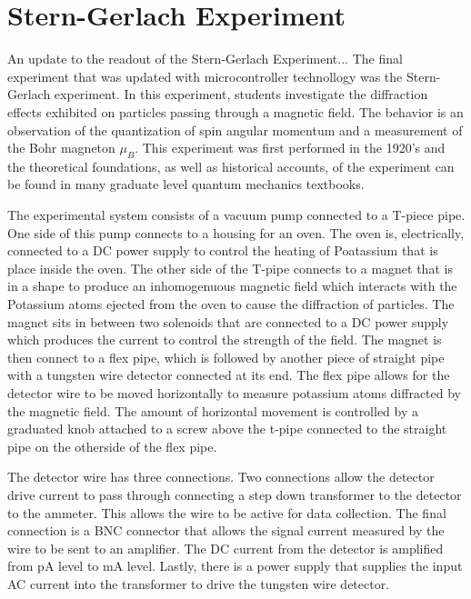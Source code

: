 \section{Stern-Gerlach Experiment}
An update to the readout of the Stern-Gerlach Experiment...
The final experiment that was updated with microcontroller technollogy was the Stern-Gerlach experiment.
In this experiment, students investigate the diffraction effects exhibited on particles passing through a magnetic field.
The behavior is an observation of the quantization of spin angular momentum and a measurement of the Bohr magneton $\mu_{B}$.
This experiment was first performed in the 1920's and the theoretical foundations, as well as historical accounts, of the experiment can be found in many graduate level quantum mechanics textbooks.

The experimental system consists of a vacuum pump connected to a T-piece pipe.
One side of this pump connects to a housing for an oven.
The oven is, electrically, connected to a DC power supply to control the heating of Poatassium that is place inside the oven.
The other side of the T-pipe connects to a magnet that is in a shape to produce an inhomogenuous magnetic field which interacts with the Potassium atoms ejected from the oven to cause the diffraction of particles.
The magnet sits in between two solenoids that are connected to a DC power supply which produces the current to control the strength of the field.
The magnet is then connect to a flex pipe, which is followed by another piece of straight pipe with a tungsten wire detector connected at its end.
The flex pipe allows for the detector wire to be moved horizontally to measure potassium atoms diffracted by the magnetic field.
The amount of horizontal movement is controlled by a graduated knob attached to a screw above the t-pipe connected to the straight pipe on the otherside of the flex pipe.


The detector wire has three connections.
Two connections allow the detector drive current to pass through connecting a step down transformer to the detector to the ammeter.
This allows the wire to be active for data collection.
The final connection is a BNC connector that allows the signal current measured by the wire to be sent to an amplifier.
The DC current from the detector is amplified from pA level to mA level.
Lastly, there is a power supply that supplies the input AC current into the transformer to drive the tungsten wire detector.

